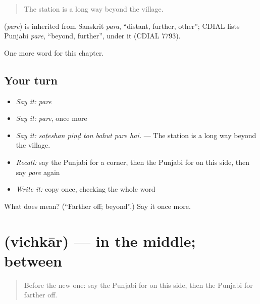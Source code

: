 \begin{quote}
The station is a long way beyond the village.
\end{quote}

\begin{cousinweb}
\textbf{} (\emph{pare}) is inherited from Sanskrit \emph{para}, \textquotedblleft{}distant, further, other\textquotedblright{}; CDIAL lists Punjabi \emph{pare}, \textquotedblleft{}beyond, further\textquotedblright{}, under it (CDIAL 7793).
\end{cousinweb}

\begin{grammarlens}[title={What you've built}]
One more word for this chapter.
\end{grammarlens}

\subsection*{Your turn}
\begin{itemize}
\raggedright
  \item \emph{Say it:} \emph{pare}
  \item \emph{Say it:} \emph{pare}, once more
  \item \emph{Say it:} \emph{saṭeshan piṇḍ ton bahut pare hai.} — The station is a long way beyond the village.
  \item \emph{Recall:} say the Punjabi for a corner, then the Punjabi for on this side, then say \emph{pare} again
  \item \emph{Write it:} copy \textbf{} once, checking the whole word
\end{itemize}

\begin{tcolorbox}[breakable,colback=teal!4,colframe=teal!35!black,title={Before you move on}]
What does  mean? (\textquotedblleft{}Farther off; beyond\textquotedblright{}.) Say it once more.
\end{tcolorbox}
\section[\texorpdfstring{\pa{ਵਿਚਕਾਰ} (vichkār)}{ਵਿਚਕਾਰ (vichkār)}]{ (vichkār) — in the middle; between}

\label{lesson:PA-C265-vichkar}



\begin{quote}
Before the new one: say the Punjabi for on this side, then the Punjabi for farther off.
\end{quote}

